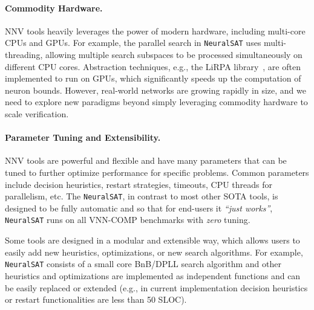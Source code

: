 \documentclass[oneside,11pt,dvipsnames]{book}
\numberwithin{equation}{section}
\theoremstyle{definition}
\theoremstyle{remark}
\newcommand{\tvn}[1]{\iftoggle{usecomment}{{\color{red}{[TVN]: #1}}}{}}
\newcommand{\hd}[1]{\iftoggle{usecomment}{{\color{blue}{[HD]: #1}}}{}}
\newcommand{\neuralsat}{\texttt{NeuralSAT}}
\newcommand{\tool}{\texttt{NeuralSAT}}
\begin{document}
\paragraph{Commodity Hardware.} NNV tools heavily leverages the power of modern hardware, including multi-core CPUs and GPUs. For example, the parallel search in \neuralsat{} uses multi-threading, allowing multiple search subspaces to be processed simultaneously on different CPU cores. Abstraction techniques, e.g., the LiRPA library~\cite{xu2020automatic},
are often implemented to run on GPUs, which significantly speeds up the computation of neuron bounds. However, real-world networks are growing rapidly in size, and we need to explore new paradigms beyond simply leveraging commodity hardware to scale verification.

\paragraph{Parameter Tuning and Extensibility.} NNV tools are powerful and flexible and have many parameters that can be tuned to further optimize performance for specific problems. Common parameters include decision heuristics, restart strategies, timeouts, CPU threads for parallelism, etc. 
The \tool{}, in contrast to most other SOTA tools, is designed to be fully automatic and so that for end-users it \emph{``just works''}, \tool{} runs on all VNN-COMP benchmarks with \emph{zero} tuning.

Some tools are designed in a modular and extensible way, which allows users to easily add new heuristics, optimizations, or new search algorithms.
For example, \tool{} consists of a small core BnB/DPLL search algorithm and other 
heuristics and optimizations are implemented as independent functions and can be easily replaced or extended (e.g., in current implementation decision heuristics or restart functionalities are less than 50 SLOC). 





\end{document}
